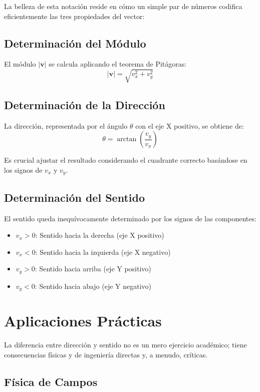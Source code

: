 \documentclass[conference]{IEEEtran}
\begin{document}
La belleza de esta notación reside en cómo un simple par de números codifica eficientemente las tres propiedades del vector:

\subsection{Determinación del Módulo}
El módulo $|\mathbf{v}|$ se calcula aplicando el teorema de Pitágoras:
\begin{equation}
|\mathbf{v}| = \sqrt{v_x^2 + v_y^2}
\end{equation}

\subsection{Determinación de la Dirección}
La dirección, representada por el ángulo $\theta$ con el eje X positivo, se obtiene de:
\begin{equation}
\theta = \arctan\left(\frac{v_y}{v_x}\right)
\end{equation}

Es crucial ajustar el resultado considerando el cuadrante correcto basándose en los signos de $v_x$ y $v_y$.

\subsection{Determinación del Sentido}
El sentido queda inequívocamente determinado por los signos de las componentes:
\begin{itemize}
\item $v_x > 0$: Sentido hacia la derecha (eje X positivo)
\item $v_x < 0$: Sentido hacia la izquierda (eje X negativo)  
\item $v_y > 0$: Sentido hacia arriba (eje Y positivo)
\item $v_y < 0$: Sentido hacia abajo (eje Y negativo)
\end{itemize}

\section{Aplicaciones Prácticas}

La diferencia entre dirección y sentido no es un mero ejercicio académico; tiene consecuencias físicas y de ingeniería directas y, a menudo, críticas.

\subsection{Física de Campos}
\end{document}
